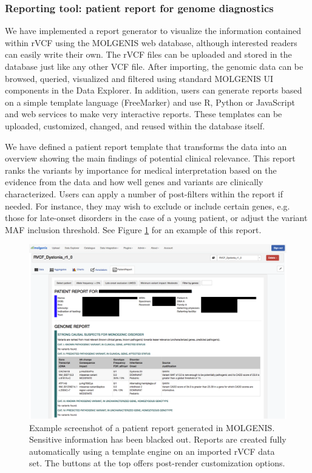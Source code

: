 \subsubsection{Reporting tool: patient report for genome diagnostics}

We have implemented a report generator to visualize the information contained within rVCF using the MOLGENIS web database, although interested readers can easily write their own.
The rVCF files can be uploaded and stored in the database just like any other VCF file.
After importing, the genomic data can be browsed, queried, visualized and filtered using standard MOLGENIS UI components in the Data Explorer.
In addition, users can generate reports based on a simple template language (FreeMarker) and use R, Python or JavaScript and web services to make very interactive reports.
These templates can be uploaded, customized, changed, and reused within the database itself.

We have defined a patient report template that transforms the data into an overview showing the main findings of potential clinical relevance.
This report ranks the variants by importance for medical interpretation based on the evidence from the data and how well genes and variants are clinically characterized\cite{McLaughlin_2014}.
Users can apply a number of post-filters within the report if needed.
For instance, they may wish to exclude or include certain genes, e.g. those for late-onset disorders in the case of a young patient, or adjust the variant MAF inclusion threshold.
See Figure \ref{fig:frameworkforgenomics_patientreport} for an example of this report.

\begin{figure}
\centering
\includegraphics[width=1.0\linewidth]{img/frameworkforgenomics_patientreport}
\caption[Example screenshot of a patient report]{Example screenshot of a patient report generated in MOLGENIS. Sensitive information has been blacked out. Reports are created fully automatically using a template engine on an imported rVCF data set. The buttons at the top offers post-render customization options.}
\label{fig:frameworkforgenomics_patientreport}
\end{figure}

